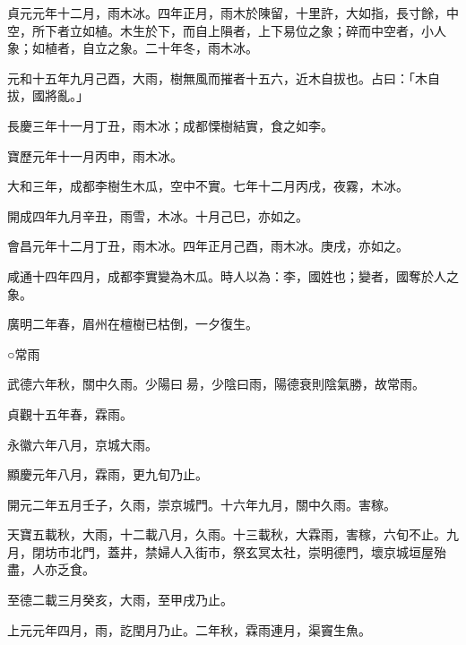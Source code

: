 \begin{pinyinscope}
 貞元元年十二月，雨木冰。四年正月，雨木於陳留，十里許，大如指，長寸餘，中空，所下者立如植。木生於下，而自上隕者，上下易位之象；碎而中空者，小人象；如植者，自立之象。二十年冬，雨木冰。



 元和十五年九月己酉，大雨，樹無風而摧者十五六，近木自拔也。占曰：「木自拔，國將亂。」



 長慶三年十一月丁丑，雨木冰；成都慄樹結實，食之如李。



 寶歷元年十一月丙申，雨木冰。



 大和三年，成都李樹生木瓜，空中不實。七年十二月丙戌，夜霧，木冰。



 開成四年九月辛丑，雨雪，木冰。十月己巳，亦如之。



 會昌元年十二月丁丑，雨木冰。四年正月己酉，雨木冰。庚戌，亦如之。



 咸通十四年四月，成都李實變為木瓜。時人以為：李，國姓也；變者，國奪於人之象。



 廣明二年春，眉州在檀樹已枯倒，一夕復生。



 ○常雨



 武德六年秋，關中久雨。少陽曰昜，少陰曰雨，陽德衰則陰氣勝，故常雨。



 貞觀十五年春，霖雨。



 永徽六年八月，京城大雨。



 顯慶元年八月，霖雨，更九旬乃止。



 開元二年五月壬子，久雨，崇京城門。十六年九月，關中久雨。害稼。



 天寶五載秋，大雨，十二載八月，久雨。十三載秋，大霖雨，害稼，六旬不止。九月，閉坊市北門，蓋井，禁婦人入街市，祭玄冥太社，崇明德門，壞京城垣屋殆盡，人亦乏食。



 至德二載三月癸亥，大雨，至甲戌乃止。



 上元元年四月，雨，訖閏月乃止。二年秋，霖雨連月，渠竇生魚。




\end{pinyinscope}
